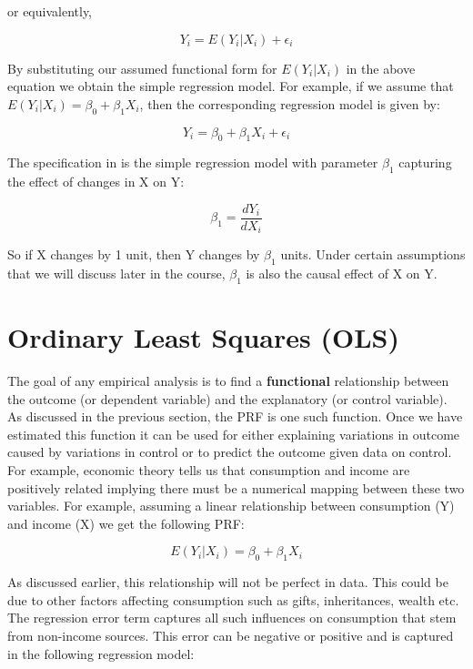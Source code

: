 \documentclass[
]{book}
\theoremstyle{definition}
\theoremstyle{definition}
\theoremstyle{definition}
\theoremstyle{definition}
\theoremstyle{remark}
\begin{document}
or equivalently,

\[Y_i = E(Y_i|X_i) + \epsilon_i\]

By substituting our assumed functional form for \(E(Y_i|X_i)\) in the above equation we obtain the simple regression model. For example, if we assume that \(E(Y_i|X_i)=\beta_0 + \beta_1 X_i\), then the corresponding regression model is given by:

\begin{equation}
Y_i=\beta_0 + \beta_1 X_i + \epsilon_i
\label{eq:simple}
\end{equation}

The specification in \label{eq:simple} is the simple regression model with parameter \(\beta_1\) capturing the effect of changes in X on Y:

\[\beta_1= \frac{dY_i}{dX_i}\]

So if X changes by 1 unit, then Y changes by \(\beta_1\) units. Under certain assumptions that we will discuss later in the course, \(\beta_1\) is also the causal effect of X on Y.

\hypertarget{ordinary-least-squares-ols}{%
\section{Ordinary Least Squares (OLS)}\label{ordinary-least-squares-ols}}

The goal of any empirical analysis is to find a \textbf{functional} relationship between the outcome (or dependent variable) and the explanatory (or control variable). As discussed in the previous section, the PRF is one such function. Once we have estimated this function it can be used for either explaining variations in outcome caused by variations in control or to predict the outcome given data on control. For example, economic theory tells us that consumption and income are positively related implying there must be a numerical mapping between these two variables. For example, assuming a linear relationship between consumption (Y) and income (X) we get the following PRF:

\[E(Y_i|X_i)=\beta_0 +\beta_1 X_i\]

As discussed earlier, this relationship will not be perfect in data. This could be due to other factors affecting consumption such as gifts, inheritances, wealth etc. The regression error term captures all such influences on consumption that stem from non-income sources. This error can be negative or positive and is captured in the following regression model:
\end{document}
